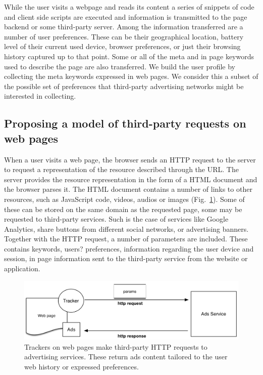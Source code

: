 While the user visits a webpage and reads its content a series of snippets of code and client side scripts are executed and information is transmitted to the page backend or some third-party server. Among the information transferred are a number of user preferences. These can be their geographical location, battery level of their current used device, browser preferences, or just their browsing history captured up to that point. Some or all of the meta and in page keywords used to describe the page are also transferred. We build the user profile by collecting the meta keywords expressed in web pages. We consider this a subset of the possible set of preferences that third-party advertising networks might be interested in collecting.

\subsection{Proposing a model of third-party requests on web pages}
\noindent
When a user visits a web page, the browser sends an HTTP request to the server to request a representation of the resource described through the URL. The server provides the resource representation in the form of a HTML document and the browser parses it. The HTML document contains a number of links to other resources, such as JavaScript code, videos, audios or images (Fig.~\ref{fig:third-party}). Some of these can be stored on the same domain as the requested page, some may be requested to third-party services. Such is the case of services like Google Analytics, share buttons from different social networks, or advertising banners. Together with the HTTP request, a number of parameters are included. These contains keywords, users? preferences, information regarding the user device and session, in page information sent to the third-party service from the website or application.

\begin{figure}
\includegraphics[width=\textwidth]{figures/tracker-request.png}
\caption[Structure of a tracker request]{Trackers on web pages make third-party HTTP requests to advertising services. These return ads content tailored to the user web history or expressed preferences.}
\label{fig:third-party}
\end{figure}



